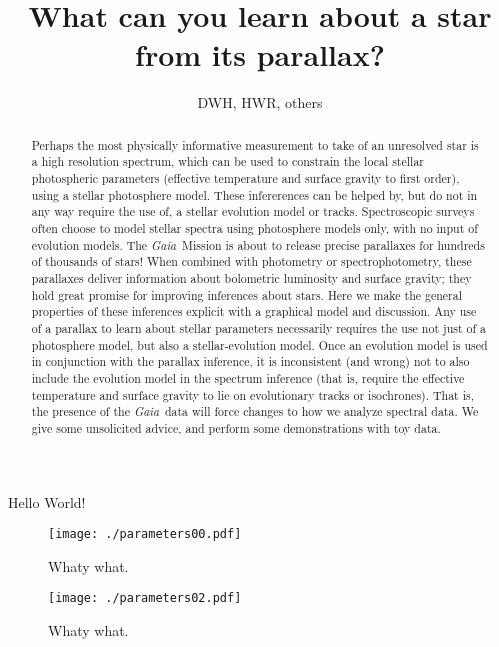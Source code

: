 \documentclass[12pt, preprint]{aastex}
\newcommand{\project}[1]{\textsl{#1}}
\newcommand{\gaia}{\project{Gaia}}
\begin{document}
\title{What can you learn about a star from its parallax?}
\author{DWH, HWR, others}

\begin{abstract}
Perhaps the most physically informative measurement to take of
an unresolved star is a high resolution spectrum, which can be used
to constrain the local stellar photospheric parameters (effective
temperature and surface gravity to first order), using a stellar
photosphere model.
These infererences can be helped by, but do not in any way require
the use of, a stellar evolution model or tracks.
Spectroscopic surveys often choose to model stellar
spectra using photosphere models only, with no input of evolution
models.
The \gaia\ Mission is about to release precise parallaxes for hundreds
of thousands of stars!
When combined with photometry or spectrophotometry, these parallaxes
deliver information about bolometric luminosity and surface gravity;
they hold great promise for improving inferences about stars.
Here we make the general properties of these inferences explicit with
a graphical model and discussion.
Any use of a parallax
to learn about stellar parameters necessarily requires the use not
just of a photosphere model, but also a stellar-evolution
model.
Once an evolution model is used in conjunction with the parallax
inference, it is inconsistent (and wrong) not to also include the
evolution model in the spectrum inference (that is, require the
effective temperature and surface gravity to lie on evolutionary
tracks or isochrones).
That is, the presence of the \gaia\ data will force changes to how
we analyze spectral data.
We give some unsolicited advice, and perform some demonstrations with toy data.
\end{abstract}


Hello World!

\clearpage
\begin{figure}
\texttt{[image: ./parameters00.pdf]}
\caption{Whaty what.\label{bad}}
\end{figure}

\clearpage
\begin{figure}
\texttt{[image: ./parameters02.pdf]}
\caption{Whaty what.\label{good}}
\end{figure}
\end{document}
